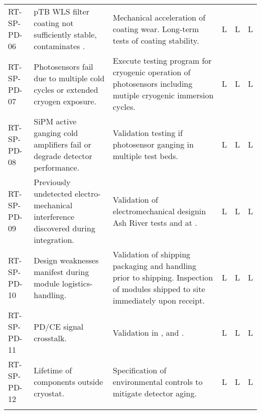 \begin{footnotesize}
\begin{longtable}{P{0.18\textwidth}P{0.20\textwidth}P{0.32\textwidth}P{0.02\textwidth}P{0.02\textwidth}P{0.02\textwidth}}
RT-SP-PD-06 & pTB WLS filter coating not sufficiently stable, contaminates . & Mechanical acceleration of coating wear.  Long-term tests of coating stability. & L & L & L \\  \colhline
RT-SP-PD-07 & Photosensors fail due to multiple cold cycles or extended cryogen exposure. & Execute testing program for cryogenic operation of photosensors including mutiple cryogenic immersion cycles. & L & L & L \\  \colhline
RT-SP-PD-08 & SiPM active ganging cold amplifiers fail or degrade detector performance. & Validation testing if photosensor ganging in multiple test beds. & L & L & L \\  \colhline
RT-SP-PD-09 & Previously undetected electro-mechanical interference discovered during integration. & Validation of electromechanical designin Ash River tests and at . & L & L & L \\  \colhline
RT-SP-PD-10 & Design weaknesses manifest during module logistics-handling. & Validation of shipping packaging and handling prior to shipping.  Inspection of modules shipped to site immediately upon receipt. & L & L & L \\  \colhline
RT-SP-PD-11 & PD/CE signal crosstalk. & Validation in ,  and . & L & L & L \\  \colhline
RT-SP-PD-12 & Lifetime of  components outside cryostat. & Specification of environmental controls to mitigate detector aging. & L & L & L \\  \colhline

\label{tab:risks:SP-FD-PD}
\end{longtable}
\end{footnotesize}
